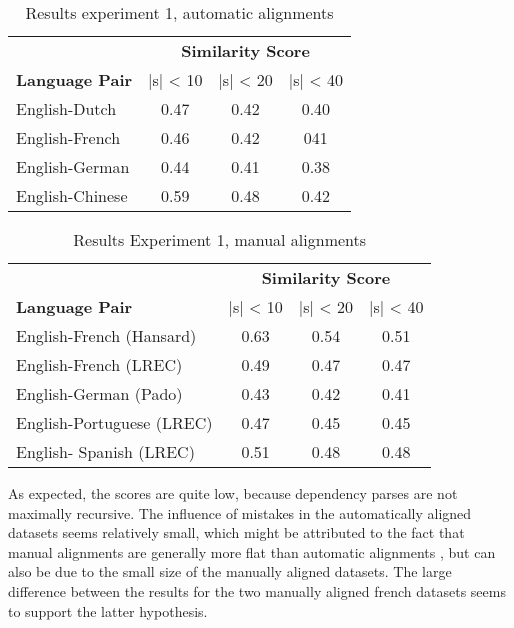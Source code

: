 \documentclass[hidelinks]{report}
\begin{document}
\begin{table}[!ht]
\begin{tabular}{|l|c|c|c|}
\hline
&\multicolumn{3}{c}{\textbf{Similarity Score}}\\
\textbf{Language Pair} & |s| < 10 & |s| < 20 & |s| < 40\\
\hline \hline
English-Dutch & 0.47 & 0.42 & 0.40 \\
\hline
English-French & 0.46 & 0.42 & 041 \\
\hline
English-German & 0.44 & 0.41 & 0.38 \\
\hline
English-Chinese & 0.59 & 0.48 & 0.42\\
\hline
\end{tabular}
\caption{Results experiment 1, automatic alignments}\label{tab:scores1}
\end{table}

\begin{table}[!ht]
\begin{tabular}{|l|c|c|c|}
\hline
&\multicolumn{3}{c}{\textbf{Similarity Score}}\\
\textbf{Language Pair} & |s| < 10 & |s| < 20 & |s| < 40\\
\hline \hline
English-French (Hansard) & 0.63 & 0.54 & 0.51 \\
English-French (LREC) & 0.49 & 0.47 & 0.47 \\
\hline
English-German (Pado) & 0.43 & 0.42 & 0.41 \\
\hline
English-Portuguese (LREC) & 0.47 & 0.45 & 0.45 \\
\hline
English- Spanish (LREC) & 0.51 & 0.48 & 0.48\\
\hline
\end{tabular}
\caption{Results Experiment 1, manual alignments}\label{tab:scores2}
\end{table}

As expected, the scores are quite low, because dependency parses are not maximally recursive. The influence of mistakes in the automatically aligned datasets seems relatively small, which might be attributed to the fact that manual alignments are generally more flat than automatic alignments \citep{simaan2013hats}, but can also be due to the small size of the manually aligned datasets. The large difference between the results for the two manually aligned french datasets seems to support the latter hypothesis.


\end{document}
